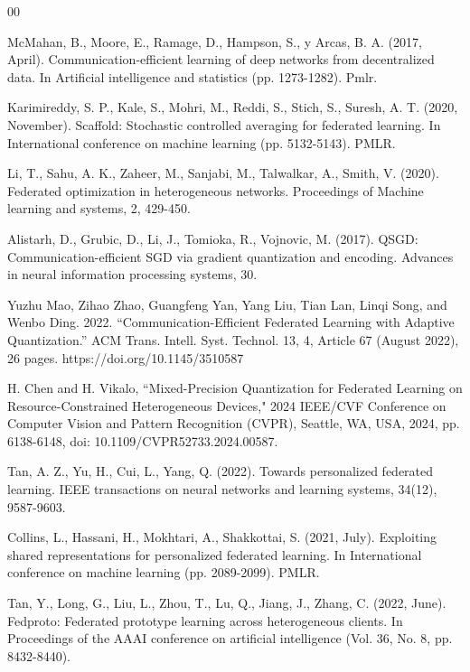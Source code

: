 \documentclass[conference]{IEEEtran}
\begin{document}
\begin{thebibliography}{00}
    
    McMahan, B., Moore, E., Ramage, D., Hampson, S., y Arcas, B. A. (2017, April). Communication-efficient learning of deep networks from decentralized data. In Artificial intelligence and statistics (pp. 1273-1282). Pmlr.
    
    Karimireddy, S. P., Kale, S., Mohri, M., Reddi, S., Stich, S., Suresh, A. T. (2020, November). Scaffold: Stochastic controlled averaging for federated learning. In International conference on machine learning (pp. 5132-5143). PMLR.
    
    Li, T., Sahu, A. K., Zaheer, M., Sanjabi, M., Talwalkar, A., Smith, V. (2020). Federated optimization in heterogeneous networks. Proceedings of Machine learning and systems, 2, 429-450.
    
    Alistarh, D., Grubic, D., Li, J., Tomioka, R., Vojnovic, M. (2017). QSGD: Communication-efficient SGD via gradient quantization and encoding. Advances in neural information processing systems, 30.
    
    Yuzhu Mao, Zihao Zhao, Guangfeng Yan, Yang Liu, Tian Lan, Linqi Song, and Wenbo Ding. 2022. ``Communication-Efficient Federated Learning with Adaptive Quantization.'' ACM Trans. Intell. Syst. Technol. 13, 4, Article 67 (August 2022), 26 pages. https://doi.org/10.1145/3510587
    
    H. Chen and H. Vikalo, ``Mixed-Precision Quantization for Federated Learning on Resource-Constrained Heterogeneous Devices," 2024 IEEE/CVF Conference on Computer Vision and Pattern Recognition (CVPR), Seattle, WA, USA, 2024, pp. 6138-6148, doi: 10.1109/CVPR52733.2024.00587.
    
    Tan, A. Z., Yu, H., Cui, L., Yang, Q. (2022). Towards personalized federated learning. IEEE transactions on neural networks and learning systems, 34(12), 9587-9603.
    
    Collins, L., Hassani, H., Mokhtari, A., Shakkottai, S. (2021, July). Exploiting shared representations for personalized federated learning. In International conference on machine learning (pp. 2089-2099). PMLR.
    
    Tan, Y., Long, G., Liu, L., Zhou, T., Lu, Q., Jiang, J., Zhang, C. (2022, June). Fedproto: Federated prototype learning across heterogeneous clients. In Proceedings of the AAAI conference on artificial intelligence (Vol. 36, No. 8, pp. 8432-8440).
    

\end{thebibliography}
\end{document}
